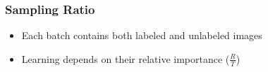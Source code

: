 \begin{frame}
	\frametitle{Sampling Ratio}
	\begin{itemize}
		\item Each batch contains both labeled and unlabeled images
		\item Learning depends on their relative importance ($\frac{R}{T}$)
	\end{itemize}
\end{frame}

